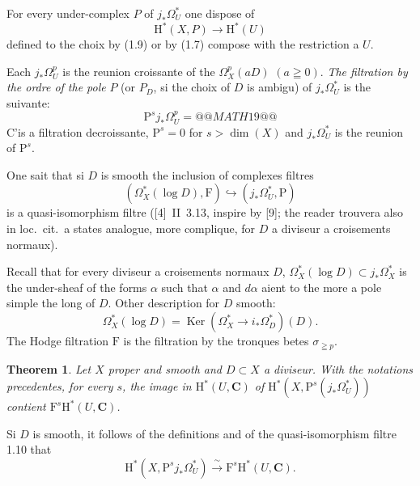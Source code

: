 \documentclass[12pt,a4paper]{article}
\theoremstyle{plain}
\newtheorem{theorem}{Theorem}
\theoremstyle{definition}
\DeclareMathOperator{\Ker}{Ker}
\begin{document}
For every under-complex $P$ of $j_* \Omega_U^*$ one dispose of
\[
\mathrm{H}^*(X, P) \to \mathrm{H}^*(U)
\]
defined to the choix by (1.9) or by (1.7) compose with the restriction a $U$.

Each $j_* \Omega_U^p$ is the reunion croissante of the $\Omega_X^p(aD)$ $(a \geqq 0)$. \textit{The filtration by the ordre of the pole} $P$ (or $P_D$, si the choix of $D$ is ambigu) of $j_* \Omega_U^*$ is the suivante:
\[
\mathrm{P}^s j_* \Omega_U^p =
@@MATH19@@
\]
C'is a filtration decroissante, $\mathrm{P}^s = 0$ for $s > \dim(X)$ and $j_* \Omega_U^*$ is the reunion of $\mathrm{P}^s$.

One sait that si $D$ is smooth the inclusion of complexes filtres
\begin{equation}\label{eq:1.10}
(\Omega_X^*(\log D), \mathrm{F}) \hookrightarrow (j_* \Omega_U^*, \mathrm{P})
\tag{1.10}
\end{equation}
is a quasi-isomorphism filtre ([4]~II~3.13, inspire by [9]; the reader trouvera also in loc.\ cit.\ a states analogue, more complique, for $D$ a diviseur a croisements normaux).

Recall that for every diviseur a croisements normaux $D$, $\Omega_X^*(\log D) \subset j_* \Omega_X^*$ is the under-sheaf of the forms $\alpha$ such that $\alpha$ and $d\alpha$ aient to the more a pole simple the long of $D$. Other description for $D$ smooth:
\[
\Omega_X^*(\log D) = \Ker(\Omega_X^* \to i_* \Omega_D^*)(D).
\]
The Hodge filtration $\mathrm{F}$ is the filtration by the tronques betes $\sigma_{\geqq p}$.

\begin{theorem}
Let $X$ proper and smooth and $D \subset X$ a diviseur. With the notations precedentes, for every $s$, the image in $\mathrm{H}^*(U, \mathbf{C})$ of $\mathrm{H}^*(X, \mathrm{P}^s(j_* \Omega_U^*))$ contient $\mathrm{F}^s \mathrm{H}^*(U, \mathbf{C})$.
\end{theorem}

Si $D$ is smooth, it follows of the definitions and of the quasi-isomorphism filtre 1.10 that
\[
\mathrm{H}^*(X, \mathrm{P}^s j_* \Omega_U^*) \xrightarrow{\;\sim\;} \mathrm{F}^s \mathrm{H}^*(U, \mathbf{C}).
\]
\end{document}
